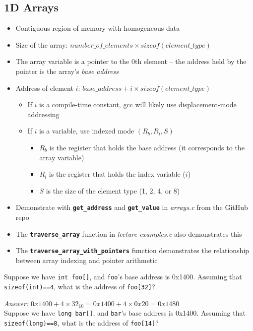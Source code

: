 \documentclass{article}
\newcommand{\function}[1]{\textbf{\lstinline{#1}}}
\begin{document}
\subsection{1D Arrays}

\begin{itemize}
\item Contiguous region of memory with homogeneous data
\item Size of the array: $number\_of\_elements \times sizeof(element\_type)$
\item The array variable is a pointer to the 0th element -- the address held by the pointer is the array's \textit{base address}
\item Address of element $i$: $base\_address + i \times sizeof(element\_type)$
    \begin{itemize}
    \item If $i$ is a compile-time constant, gcc will likely use displacement-mode addressing
    \item If $i$ is a variable, use indexed mode $(R_b, R_i, S)$
        \begin{itemize}
            \item $R_b$ is the register that holds the base address (it corresponds to the array variable)
            \item $R_i$ is the register that holds the index variable ($i$)
            \item $S$ is the size of the element type (1, 2, 4, or 8)
        \end{itemize}
    \end{itemize}
\item Demonstrate with \function{get_address} and \function{get_value} in \textit{arrays.c} from the GitHub repo
\item The \function{traverse_array} function in \textit{lecture-examples.c} also demonstrates this
\item The \function{traverse_array_with_pointers} function demonstrates the relationship between array indexing and pointer arithmetic
\end{itemize}

Suppose we have \lstinline{int foo[]}, and \lstinline{foo}'s base address is 0x1400. Assuming that \lstinline{sizeof(int)==4}, what is the address of \lstinline{foo[32]}?

\textit{Answer:} $0x1400 + 4 \times 32_{10} = 0x1400 + 4 \times 0x20 = 0x1480$ \\

Suppose we have \lstinline{long bar[]}, and \lstinline{bar}'s base address is 0x1400. Assuming that \lstinline{sizeof(long)==8}, what is the address of \lstinline{foo[14]}?
\end{document}
